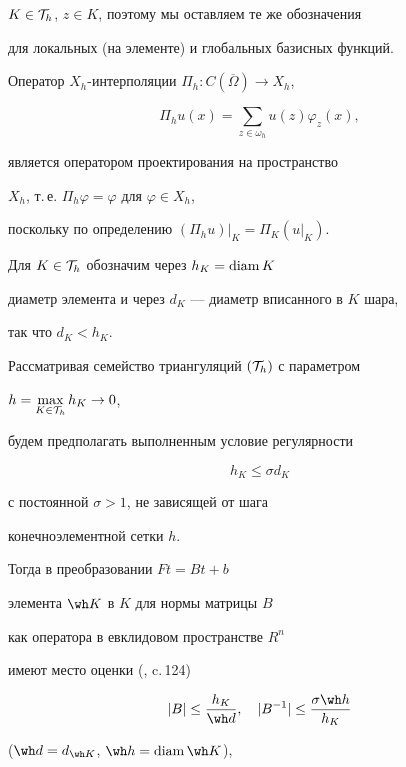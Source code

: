 $K \in {\cal T}_h$, $z \in K$, поэтому мы оставляем те же обозначения 


для локальных (на элементе) и глобальных базисных функций. 


Оператор $X_h$-интерполяции $\Pi_h:C(\overline{\Omega}) \rightarrow X_h$, 


$$


\Pi_h u (x) = \sum _{z\in \omega_h} u(z)\varphi_z(x),


$$


является оператором проектирования на пространство 


$X_h$, т.\,е. $\Pi_h \varphi=\varphi$ для $\varphi \in X_h$, 


поскольку по определению ${(\Pi_h u)|}_K=\Pi_K (u|_K)$.





Для $K \in {\cal T}_h$ обозначим через $h_K=\operatorname{diam} K$


диаметр элемента и через $d_K$ --- диаметр вписанного в $K$ шара, 


так что $d_K < h_K$. 


Рассматривая семейство триангуляций $({\cal T}_h)$ с параметром 


$h=\max \limits_{K \in {\cal T}_h} h_K \rightarrow 0$, 


будем предполагать выполненным условие регулярности 


\begin{equation}


h_K \le \sigma d_K


\end{equation}


с постоянной $\sigma >1$, не зависящей от шага 


конечноэлементной сетки $h$. 


Тогда в преобразовании $Ft=Bt+b$ 


элемента $\wh K$ в $K$ для нормы матрицы $B$ 


как оператора в евклидовом пространстве $R^n$ 


имеют место оценки (\cite{Ciarlet}, c.\,124) 


\begin{equation} \label{B}


|B| \le \frac{h_K}{\wh d}, \quad |B^{-1}| \le \frac{\sigma \wh h}{h_K}


\end{equation}


($\wh d=d_{\wh K}$, $\wh h = \diam \wh K$),


